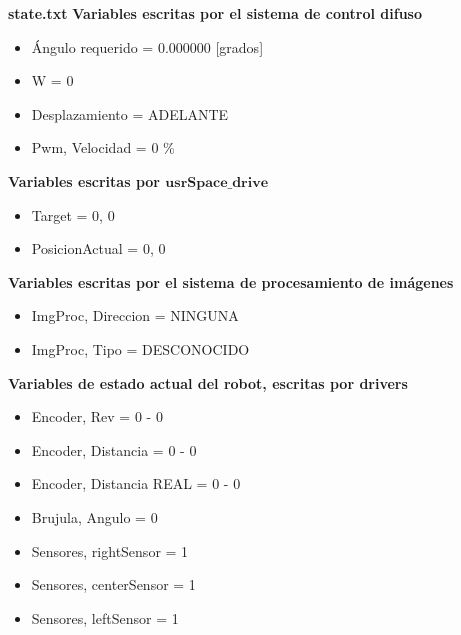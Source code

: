 {\huge\textbf {state.txt}}
\bigbreak
\textbf{Variables escritas por el sistema de control difuso}
\begin{itemize}
    \item Ángulo requerido = 0.000000 [grados] 
    \item W = 0 
    \item Desplazamiento = ADELANTE 
    \item Pwm, Velocidad = 0 \% 
\end{itemize}
\bigbreak
\textbf{Variables escritas por $\textbf{usrSpace\_drive}$}
\begin{itemize}
    \item Target = 0, 0 
    \item PosicionActual = 0, 0 
\end{itemize}
\bigbreak
\textbf{Variables escritas por el sistema de procesamiento de imágenes}
\begin{itemize}
    \item ImgProc, Direccion = NINGUNA 
    \item ImgProc, Tipo = DESCONOCIDO 
\end{itemize}
\textbf{Variables de estado actual del robot, escritas por drivers}
\begin{itemize}
    \item Encoder, Rev = 0 - 0 
    \item Encoder, Distancia = 0 - 0 
    \item Encoder, Distancia REAL = 0 - 0 
    \item Brujula, Angulo = 0 
    \item Sensores, rightSensor = 1 
    \item Sensores, centerSensor = 1 
    \item Sensores, leftSensor = 1 
\end{itemize}